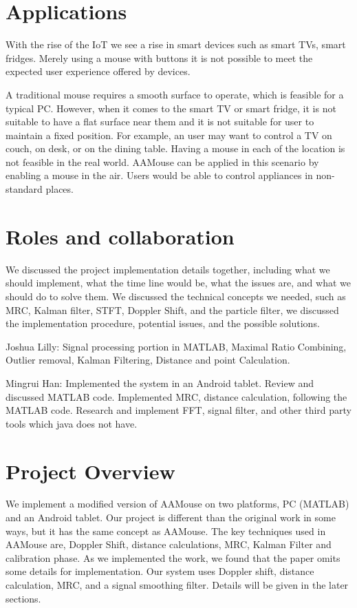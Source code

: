 \documentclass{acm_proc_article-sp}
\begin{document}
\section{Applications} \label{applications}
With the rise of the IoT we see a rise in smart devices
such as smart TVs, smart fridges. Merely using a mouse with buttons it is not possible to meet
the expected user experience offered by devices.

A traditional mouse requires a smooth surface to operate, which is 
feasible for a typical PC. However, when it comes to the smart TV
or smart fridge, it is not suitable to have a flat surface near them
and it is not suitable for user to maintain a fixed position. For example, an user may want to control a TV 
on couch, on desk, or on the dining table. Having a mouse in each of the location is not feasible in the real world. AAMouse can be
applied in this scenario by enabling a mouse in the air.
Users would be able to control appliances in non-standard places.

\section{Roles and collaboration} \label{roles and collaboration}
We discussed the project implementation details together, including
what we should implement, what the time line would be, what the issues
are, and what we should do to solve them. We discussed the technical concepts
we needed, such as MRC, Kalman filter, STFT, Doppler Shift, and the
particle filter, we discussed the implementation procedure, 
potential issues, and the possible solutions.

Joshua Lilly: Signal processing portion in MATLAB, Maximal Ratio Combining, Outlier removal, Kalman Filtering, Distance and point Calculation.

Mingrui Han: Implemented the system in an Android tablet. Review and discussed MATLAB code. Implemented MRC, distance calculation, following the MATLAB code. 
Research and implement FFT, signal filter, and other third party tools which java 
does not have. 

\section{Project Overview} \label{project_overview}
We implement a modified version of AAMouse on two platforms, PC
(MATLAB) and an Android tablet. Our project is different than the 
original work in some ways, but it has the same concept as AAMouse.
The key techniques used in AAMouse are, Doppler Shift, distance
calculations, MRC, Kalman Filter and
calibration phase. As we implemented the work,
we found that the paper omits some details for implementation. Our system uses Doppler shift, distance calculation, 
MRC, and a signal smoothing filter. Details will be given in the later 
sections. 
\end{document}
